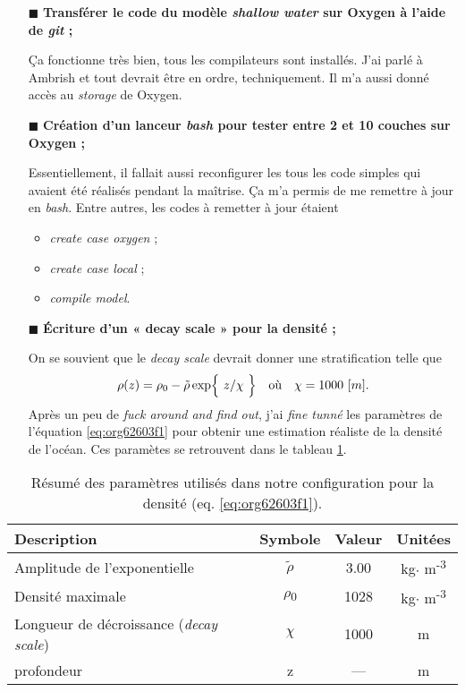 \documentclass[10pt]{report}
\numberwithin{equation}{section}
\renewcommand{\boxtimes}{\blacksquare}
\newcommand{\tall}{\vphantom{A^{x^x}_p}}
\begin{document}
\begin{itemize}
\item[{$\boxtimes$}] \textbf{Transférer le code du modèle \emph{shallow water} sur Oxygen à l'aide de \emph{git} ;}

Ça fonctionne très bien, tous les compilateurs sont installés.
J'ai parlé à Ambrish et tout devrait être en ordre, techniquement.
Il m'a aussi donné accès au \emph{storage} de Oxygen.\bigskip

\item[{$\boxtimes$}] \textbf{Création d'un lanceur \emph{bash} pour tester entre 2 et 10 couches sur Oxygen ;}

Essentiellement, il fallait aussi reconfigurer les tous les code simples qui avaient été réalisés pendant la maîtrise.
Ça m'a permis de me remettre à jour en \emph{bash}.
Entre autres, les codes à remetter à jour étaient
\begin{itemize}
\item \emph{create case oxygen} ;
\item \emph{create case local} ;
\item \emph{compile model}.\bigskip
\end{itemize}

\item[{$\boxtimes$}] \textbf{Écriture d'un « decay scale » pour la densité ;}

On se souvient que le \emph{decay scale} devrait donner une stratification telle que
\begin{align}
\label{eq:org62603f1}
  && \rho(z) = \rho_0 - \tilde{\rho}\exp{\ z/\chi\tall\ } && \text{où} && \chi = 1000\ [m]. &&
\end{align}
Après un peu de \emph{fuck around and find out}, j'ai \emph{fine tunné} les paramètres de l'équation \ref{eq:org62603f1} pour obtenir une estimation réaliste de la densité de l'océan.
Ces paramètes se retrouvent dans le tableau \ref{tab:org8686eb4}.\bigskip
\end{itemize}

\begin{table}[htbp]
\caption{\label{tab:org8686eb4}Résumé des paramètres utilisés dans notre configuration pour la densité (eq. \ref{eq:org62603f1}).}
\centering
\begin{tabular}{lccc}
\hline
\hline
Description & Symbole & Valeur & Unitées\\[0pt]
\hline
Amplitude de l'exponentielle & \(\tilde{\rho}\) & 3.00 & kg\(\cdot\) m\textsuperscript{-3}\\[0pt]
Densité maximale & \(\rho\)\textsubscript{0} & 1028 & kg\(\cdot\) m\textsuperscript{-3}\\[0pt]
Longueur de décroissance (\emph{decay scale}) & \(\chi\) & 1000 & m\\[0pt]
profondeur & z & --- & m\\[0pt]
\hline
\end{tabular}
\end{table}
\end{document}
